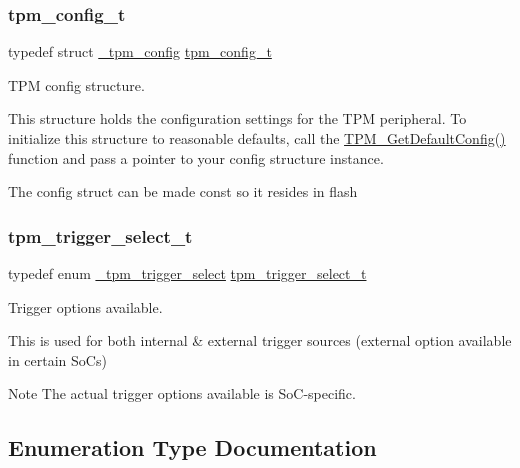 \subsubsection{\texorpdfstring{tpm\_config\_t}{tpm\_config\_t}}
{\footnotesize\ttfamily typedef struct \mbox{\hyperlink{struct__tpm__config}{\+\_\+tpm\+\_\+config}}  \mbox{\hyperlink{group__tpm_ga5647039a18486c876df5cdeb84c9621d}{tpm\+\_\+config\+\_\+t}}}



T\+PM config structure. 

This structure holds the configuration settings for the T\+PM peripheral. To initialize this structure to reasonable defaults, call the \mbox{\hyperlink{group__tpm_ga53fcb634d4c70d9bcb14c972944d949f}{T\+P\+M\+\_\+\+Get\+Default\+Config()}} function and pass a pointer to your config structure instance.

The config struct can be made const so it resides in flash \mbox{\label{group__tpm_ga7413575956cb565fba0cc99c39c73bc7}} 
\subsubsection{\texorpdfstring{tpm\_trigger\_select\_t}{tpm\_trigger\_select\_t}}
{\footnotesize\ttfamily typedef enum \mbox{\hyperlink{group__tpm_ga4150281c92685f3d25f13279bdef4b0c}{\+\_\+tpm\+\_\+trigger\+\_\+select}}  \mbox{\hyperlink{group__tpm_ga7413575956cb565fba0cc99c39c73bc7}{tpm\+\_\+trigger\+\_\+select\+\_\+t}}}



Trigger options available. 

This is used for both internal \& external trigger sources (external option available in certain SoC\textquotesingle{}s)

\begin{DoxyNote}{Note}
The actual trigger options available is So\+C-\/specific. 
\end{DoxyNote}


\subsection{Enumeration Type Documentation}
\mbox{\label{group__tpm_gacc39a4172737e2409c9b198604b1b4a4}} 
